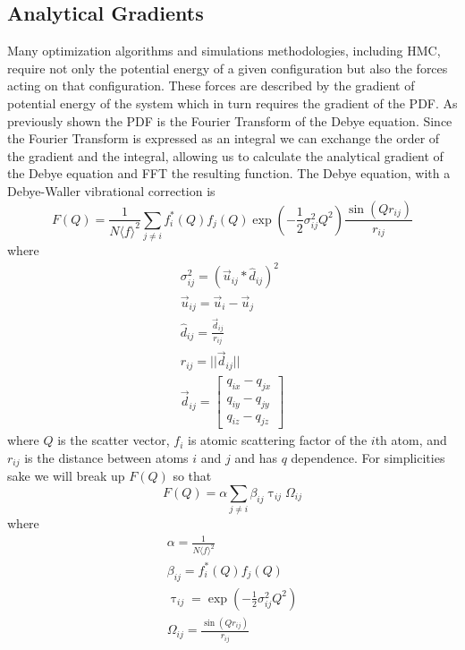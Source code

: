 \subsection{Analytical Gradients}
Many optimization algorithms and simulations methodologies, including HMC, require not only the potential energy of a given configuration but also the forces acting on that configuration.
These forces are described by the gradient of potential energy of the system which in turn requires the gradient of the PDF.
As previously shown the PDF is the Fourier Transform of the Debye equation.
Since the Fourier Transform is expressed as an integral we can exchange the order of the gradient and the integral, allowing us to calculate the analytical gradient of the Debye equation and FFT the resulting function.
The Debye equation, with a Debye-Waller vibrational correction is
\begin{equation}
F(Q) = \frac{1}{N \langle f \rangle^{2}} \sum_{j\neq i} f_i^{*}(Q)f_j(Q) \exp(-\frac{1}{2}\sigma_{ij}^{2}Q^{2}) \frac{\sin(Qr_{ij})}{r_{ij}}
\end{equation}
where
\begin{eqnarray}
  \sigma_{ij}^{2} = (\vec{u}_{ij} * \hat{d}_{ij})^{2}\\
  \vec{u}_{ij} = \vec{u}_{i} - \vec{u}_{j}\\
  \hat{d}_{ij} = \frac{\vec{d}_{ij}}{r_{ij}}\\
  r_{ij} = ||\vec{d}_{ij}|| \\
  \vec{d}_{ij} =
  \begin{bmatrix}
    q_{ix} - q_{jx}\\
    q_{iy} - q_{jy} \\
    q_{iz} - q_{jz}
  \end{bmatrix}
\end{eqnarray}
where $Q$ is the scatter vector, $f_i$ is atomic scattering factor of the $i$th atom, and $r_{ij}$ is the distance between atoms $i$ and $j$ and has $q$ dependence.
For simplicities sake we will break up $F(Q)$ so that
\begin{equation}
F(Q) = \alpha \sum_{j\neq i} \beta_{ij} \uptau_{ij} \Omega_{ij}
\end{equation}
where
\begin{eqnarray}
  \alpha = \frac{1}{N \langle f \rangle^{2}} \\
  \beta_{ij} = f_i^{*}(Q)f_j(Q)\\
  \uptau_{ij} = \exp(-\frac{1}{2}\sigma_{ij}^{2}Q^{2})\\
  \Omega_{ij} = \frac{\sin(Qr_{ij})}{r_{ij}}
\end{eqnarray}

